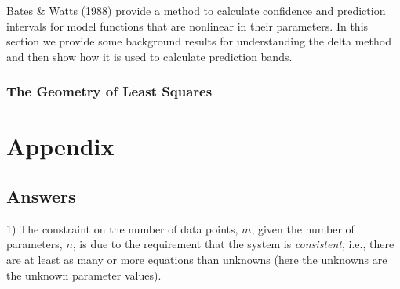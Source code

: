 \documentclass[11pt,a4paper]{article}
\begin{document}
Bates \& Watts (1988) provide a method to calculate confidence and prediction intervals
for model functions that are nonlinear in their parameters. 
In this section we provide some background results for understanding the delta method
and then show how it is used to calculate prediction bands.

\subsubsection{The Geometry of Least Squares}


\clearpage
\section{Appendix}

\subsection{Answers}

1) The constraint on the number of data points, \(m\), given the number
of parameters, \(n\), is due to the requirement that the system is
\emph{consistent}, i.e., there are at least as many or more equations
than unknowns (here the unknowns are the unknown parameter values).
\end{document}
